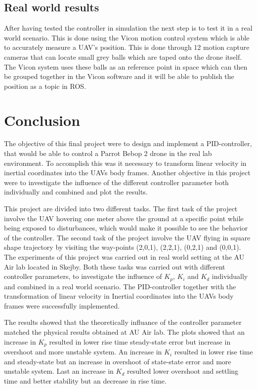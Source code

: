 \documentclass[conference]{IEEEtran}
\begin{document}
\subsection{Real world results}
After having tested the controller in simulation the next step is to test it in a real world scenario. This is done using the Vicon motion control system which is able to accurately measure a UAV's position. This is done through 12 motion capture cameras that can locate small grey balls which are taped onto the drone itself. The Vicon system uses these balls as an reference point in space which can then be grouped together in the Vicon software and it will be able to publish the position as a topic in ROS.

\section{Conclusion}
The objective of this final project were to design and implement a PID-controller, that would be able to control a Parrot Bebop 2 drone in the real lab environment. To accomplish this was it necessary to transform linear velocity in inertial coordinates into the UAVs body frames. Another objective in this project were to investigate the influence of the different controller parameter both individually and combined and plot the results. 

This project are divided into two different tasks. The first task of the project involve the UAV hovering one meter above the ground at a specific point while being exposed to disturbances, which would make it possible to see the behavior of the controller. The second task of the project involve the UAV flying in square shape trajectory by visiting the way-points (2,0,1), (2,2,1), (0,2,1) and (0,0,1). The experiments of this project was carried out in real world setting at the AU Air lab located in Skejby. Both these tasks was carried out with different controller parameters, to investigate the influence of $K_p$, $K_i$ and $K_d$ individually and combined in a real world scenario. The PID-controller together with the transformation of linear velocity in Inertial coordinates into the UAVs body frames were successfully implemented.

The results showed that the theoretically influance of the controller parameter matched the physical results obtained at AU Air lab. The plots showed that an increase in $K_p$ resulted in lower rise time steady-state error but increase in overshoot and more unstable system. An increase in $K_i$ resulted in lower rise time and steady-state but an increase in overshoot of state-state error and more unstable system. Last an increase in $K_d$ resulted lower overshoot and settling time and better stability but an decrease in rise time. 
\end{document}
